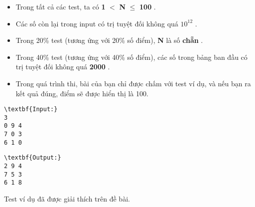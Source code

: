 \begin{itemize}
	\item     Trong tất cả các test, ta có    \textbf{     1    }    $<$    \textbf{     N    }     $\le$     \textbf{     100    }    .   
	\item     Các số còn lại trong input có trị tuyệt đối không quá    \textbf{     $10^{12}$}    .   
	\item     Trong 20\% test (tương ứng với 20\% số điểm),    \textbf{     N    }    là số    \textbf{     chẵn    }    .   
	\item     Trong 40\% test (tương ứng với 40\% số điểm), các số trong bảng ban đầu có trị tuyệt đối không quá    \textbf{     2000    }    .   
	\item     Trong quá trình thi, bài của bạn chỉ được chấm với test ví dụ, và nếu bạn ra kết quả đúng, điểm sẽ được hiển thị là 100.   
\end{itemize}
\begin{verbatim}
\textbf{Input:}
3
0 9 4
7 0 3
6 1 0
\end{verbatim}
\begin{verbatim}
\textbf{Output:}
2 9 4
7 5 3
6 1 8
\end{verbatim}
Test ví dụ đã được giải thích trên đề bài.